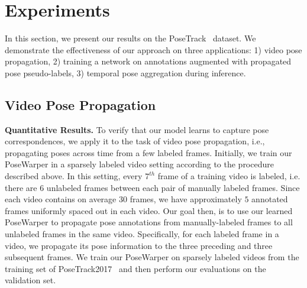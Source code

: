 \documentclass{article}
\begin{document}
\section{Experiments}



In this section, we present our results on the PoseTrack~\cite{Iqbal_CVPR2017} dataset. We demonstrate the effectiveness of our approach on three applications: 1) video pose propagation, 2) training a network on annotations augmented with propagated pose pseudo-labels, 3) temporal pose aggregation during inference. 















\subsection{Video Pose Propagation}


\textbf{Quantitative Results.} To verify that our model learns to capture pose correspondences, we apply it to the task of video pose propagation, i.e., propagating poses across time from a few labeled frames. Initially, we train our PoseWarper in a sparsely labeled video setting according to the procedure described above. In this setting, every $7^{th}$ frame of a training video is labeled, i.e. there are $6$ unlabeled frames between each pair of manually labeled frames.  Since each video contains on average 30 frames, we have approximately $5$ annotated frames uniformly spaced out in each video. Our goal then, is to use our learned PoseWarper to propagate pose annotations from manually-labeled frames to all unlabeled frames in the same video. Specifically, for each labeled frame in a video, we propagate its pose information to the three preceding and three subsequent frames. We train our PoseWarper on sparsely labeled videos from the training set of PoseTrack2017~\cite{Iqbal_CVPR2017} and then perform our evaluations on the validation set.
\end{document}
